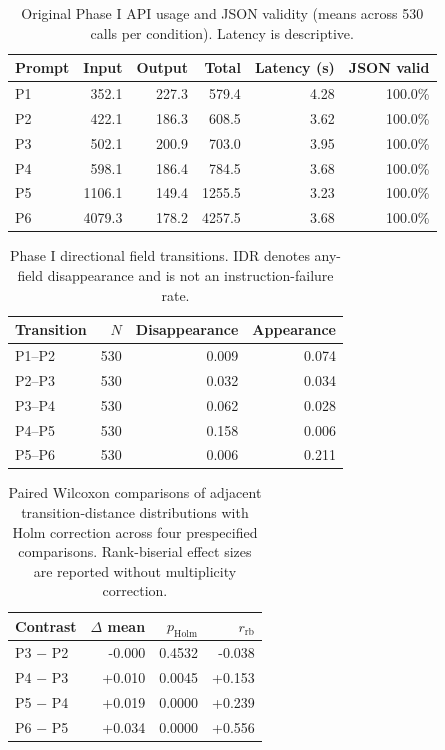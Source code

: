 \documentclass[fleqn,10pt]{wlscirep-authoryear}
\begin{document}
\begin{table}[t]
\centering
\small
\caption{Original Phase I API usage and JSON validity (means across 530 calls per condition). Latency is descriptive.}
\label{tab:phase1-usage}
\begin{tabular}{lrrrrr}
\toprule
Prompt & Input & Output & Total & Latency (s) & JSON valid \\
\midrule
P1 & 352.1 & 227.3 & 579.4 & 4.28 & 100.0\% \\
P2 & 422.1 & 186.3 & 608.5 & 3.62 & 100.0\% \\
P3 & 502.1 & 200.9 & 703.0 & 3.95 & 100.0\% \\
P4 & 598.1 & 186.4 & 784.5 & 3.68 & 100.0\% \\
P5 & 1106.1 & 149.4 & 1255.5 & 3.23 & 100.0\% \\
P6 & 4079.3 & 178.2 & 4257.5 & 3.68 & 100.0\% \\
\bottomrule
\end{tabular}
\end{table}

\begin{table}[t]
\centering
\small
\caption{Phase I directional field transitions. IDR denotes any-field disappearance and is not an instruction-failure rate.}
\label{tab:phase1-idr}
\begin{tabular}{lrrr}
\toprule
Transition & $N$ & Disappearance & Appearance \\
\midrule
P1--P2 & 530 & 0.009 & 0.074 \\
P2--P3 & 530 & 0.032 & 0.034 \\
P3--P4 & 530 & 0.062 & 0.028 \\
P4--P5 & 530 & 0.158 & 0.006 \\
P5--P6 & 530 & 0.006 & 0.211 \\
\bottomrule
\end{tabular}
\end{table}

\begin{table}[t]
\centering
\small
\caption{Paired Wilcoxon comparisons of adjacent transition-distance distributions with Holm correction across four prespecified comparisons. Rank-biserial effect sizes are reported without multiplicity correction.}
\label{tab:phase1-paired}
\begin{tabular}{lrrr}
\toprule
Contrast & $\Delta$ mean & $p_{\mathrm{Holm}}$ & $r_{\mathrm{rb}}$ \\
\midrule
P3 $-$ P2 & -0.000 & 0.4532 & -0.038 \\
P4 $-$ P3 & +0.010 & 0.0045 & +0.153 \\
P5 $-$ P4 & +0.019 & 0.0000 & +0.239 \\
P6 $-$ P5 & +0.034 & 0.0000 & +0.556 \\
\bottomrule
\end{tabular}
\end{table}
\end{document}
